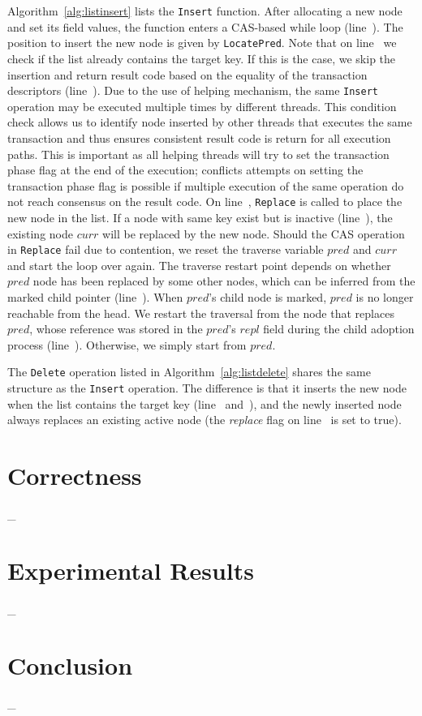\documentclass[10pt,conference,compsocconf]{IEEEtran}
\begin{document}
Algorithm~\ref{alg:listinsert} lists the \texttt{Insert} function.
After allocating a new node and set its field values, the function enters a CAS-based while loop (line~).
The position to insert the new node is given by \texttt{LocatePred}.
Note that on line~ we check if the list already contains the target key.
If this is the case, we skip the insertion and return result code based on the equality of the transaction descriptors (line~).
Due to the use of helping mechanism, the same \texttt{Insert} operation may be executed multiple times by different threads.
This condition check allows us to identify node inserted by other threads that executes the same transaction and thus ensures consistent result code is return for all execution paths.
This is important as all helping threads will try to set the transaction phase flag at the end of the execution; conflicts attempts on setting the transaction phase flag is possible if multiple execution of the same operation do not reach consensus on the result code.
On line~, \texttt{Replace} is called to place the new node in the list.
If a node with same key exist but is inactive (line~), the existing node $curr$ will be replaced by the new node.
Should the CAS operation in \texttt{Replace} fail due to contention, we reset the traverse variable $pred$ and $curr$ and start the loop over again.
The traverse restart point depends on whether $pred$ node has been replaced by some other nodes, which can be inferred from the marked child pointer (line~).
When $pred$'s child node is marked, $pred$ is no longer reachable from the head.
We restart the traversal from the node that replaces $pred$, whose reference was stored in the $pred$'s $repl$ field during the child adoption process (line~).
Otherwise, we simply start from $pred$.

The \texttt{Delete} operation listed in Algorithm~\ref{alg:listdelete} shares the same structure as the \texttt{Insert} operation.
The difference is that it inserts the new node when the list contains the target key (line~ and~), and the newly inserted node always replaces an existing active node (the \textit{replace} flag on line~ is set to true).

\section{Correctness}
\label{sec:correctness}
\_

\section{Experimental Results}
\label{sec:experiment}
\_

\section{Conclusion}
\label{sec:conclusion}
\_




\end{document}
